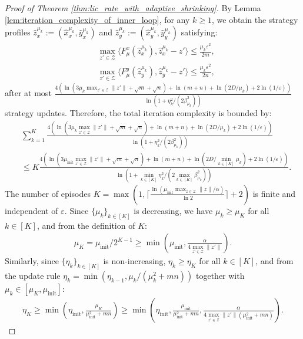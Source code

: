 \documentclass{article}
\newcommand{\Z}{\mathcal{Z}}
\theoremstyle{plain}
\begin{document}
\begin{proof}[Proof of Theorem \ref{thm:lic_rate_with_adaptive_shrinking}]
    By Lemma \ref{lem:iteration_complexity_of_inner_loop}, for any $k \geq 1$, we obtain the strategy profiles $\hat{z}_x^{\mu_k} := (\hat{x}_x^{\mu_k}, \hat{y}_x^{\mu_k})$ and $\hat{z}_y^{\mu_k} := (\hat{x}_y^{\mu_k}, \hat{y}_y^{\mu_k})$ satisfying:
    \begin{align*}
        & \max_{z'\in \Z}\langle F_{\mu}^x(\hat{z}_x^{\mu_k}), \hat{z}_x^{\mu_k} - z'\rangle \leq \frac{\mu_k \varepsilon^2}{2m}, \\
        & \max_{z'\in \Z}\langle F_{\mu}^y(\hat{z}_y^{\mu_k}), \hat{z}_y^{\mu_k} - z'\rangle \leq \frac{\mu_k \varepsilon^2}{2n},
    \end{align*}
    after at most $\frac{ 4\left(\ln \left(3\mu_k\max_{z'\in \Z}\|z'\| + \sqrt{m} + \sqrt{n}\right) + \ln \left(m + n\right) + \ln (2D/\mu_k) + 2\ln (1/\varepsilon)\right)}{\ln \left(1 + \eta_k^2 / (2\beta_{\mu_k}^2)\right)}$ strategy updates.
    Therefore, the total iteration complexity is bounded by:
    \begin{align}
        & \sum_{k=1}^K \frac{4\left(\ln \left(3\mu_k\max_{z'\in \Z}\|z'\| + \sqrt{m} + \sqrt{n}\right) + \ln \left(m + n\right) + \ln (2D/\mu_k) + 2\ln (1/\varepsilon)\right)}{\ln \left(1 + \eta_k^2 / (2\beta_{\mu_k}^2)\right)} \nonumber \\
        &\leq K \frac{4\left(\ln \left(3\mu_{\mathrm{init}}\max_{z'\in \Z}\|z'\| + \sqrt{m} + \sqrt{n}\right) + \ln \left(m + n\right) + \ln (2D/\min_{k\in [K]}\mu_k) + 2\ln (1/\varepsilon)\right)}{\ln \left(1 + \min_{k\in [K]}\eta_k^2 / (2\max_{k\in [K]}\beta_{\mu_k}^2)\right)}.
        \label{eq:total_iteration_upper_bound}
    \end{align}
    The number of episodes $K = \max\left(1, \lceil \frac{\ln (\mu_{\mathrm{init}}\max_{z\in \Z}\|z\|/\alpha)}{\ln 2}\rceil + 2\right)$ is finite and independent of $\varepsilon$.
    Since $\{\mu_k\}_{k\in [K]}$ is decreasing, we have $\mu_k \geq \mu_K$ for all $k\in [K]$, and from the definition of $K$:
    \begin{align*}
        \mu_K = \mu_{\mathrm{init}}/2^{K-1} \geq \min\left(\mu_{\mathrm{init}}, \frac{\alpha}{4\max_{z'\in \Z}\|z'\|}\right).
    \end{align*}
    Similarly, since $\{\eta_k\}_{k\in [K]}$ is non-increasing, $\eta_k \geq \eta_K$ for all $k\in [K]$, and from the update rule $\eta_k = \min(\eta_{k-1}, \mu_k/(\mu_k^2 + mn))$ together with $\mu_k \in [\mu_K, \mu_{\mathrm{init}}]$:
    \begin{align*}
        \eta_K \geq \min\left(\eta_{\mathrm{init}}, \frac{\mu_K}{\mu_{\mathrm{init}}^2 + mn}\right) \geq \min\left(\eta_{\mathrm{init}}, \frac{\mu_{\mathrm{init}}}{\mu_{\mathrm{init}}^2 + mn}, \frac{\alpha}{4\max_{z'\in \Z}\|z'\|(\mu_{\mathrm{init}}^2 + mn)}\right).

\end{align*}
\end{proof}
\end{document}
